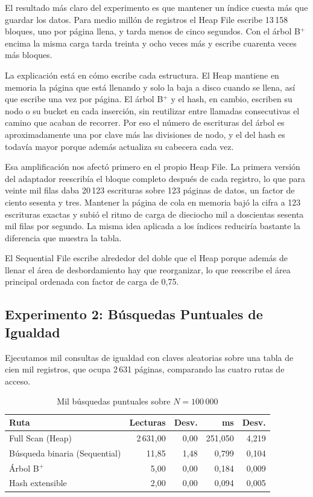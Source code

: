 \documentclass[a4paper,12pt]{article}
\begin{document}
El resultado más claro del experimento es que mantener un índice cuesta más que
guardar los datos. Para medio millón de registros el Heap File escribe 13\,158
bloques, uno por página llena, y tarda menos de cinco segundos. Con el árbol
B$^+$ encima la misma carga tarda treinta y ocho veces más y escribe cuarenta
veces más bloques.

La explicación está en cómo escribe cada estructura. El Heap mantiene en memoria
la página que está llenando y solo la baja a disco cuando se llena, así que
escribe una vez por página. El árbol B$^+$ y el hash, en cambio, escriben su
nodo o su bucket en cada inserción, sin reutilizar entre llamadas consecutivas
el camino que acaban de recorrer. Por eso el número de escrituras del árbol es
aproximadamente una por clave más las divisiones de nodo, y el del hash es
todavía mayor porque además actualiza su cabecera cada vez.

Esa amplificación nos afectó primero en el propio Heap File. La primera versión
del adaptador reescribía el bloque completo después de cada registro, lo que
para veinte mil filas daba 20\,123 escrituras sobre 123 páginas de datos, un
factor de ciento sesenta y tres. Mantener la página de cola en memoria bajó la
cifra a 123 escrituras exactas y subió el ritmo de carga de dieciocho mil a
doscientas sesenta mil filas por segundo. La misma idea aplicada a los índices
reduciría bastante la diferencia que muestra la tabla.

El Sequential File escribe alrededor del doble que el Heap porque además de
llenar el área de desbordamiento hay que reorganizar, lo que reescribe el área
principal ordenada con factor de carga de 0{,}75.

\subsection{Experimento 2: Búsquedas Puntuales de Igualdad}

Ejecutamos mil consultas de igualdad con claves aleatorias sobre una tabla de
cien mil registros, que ocupa 2\,631 páginas, comparando las cuatro rutas de
acceso.

\begin{table}[H]
\centering
\caption{Mil búsquedas puntuales sobre $N = 100\,000$}
\begin{tabular}{@{}lrrrr@{}}
\toprule
\textbf{Ruta} & \textbf{Lecturas} & \textbf{Desv.} & \textbf{ms} & \textbf{Desv.} \\
\midrule
Full Scan (Heap) & 2\,631{,}00 & 0{,}00 & 251{,}050 & 4{,}219 \\
Búsqueda binaria (Sequential) & 11{,}85 & 1{,}48 & 0{,}799 & 0{,}104 \\
Árbol B$^+$ & 5{,}00 & 0{,}00 & 0{,}184 & 0{,}009 \\
Hash extensible & 2{,}00 & 0{,}00 & 0{,}094 & 0{,}005 \\
\bottomrule
\end{tabular}
\end{table}
\end{document}
